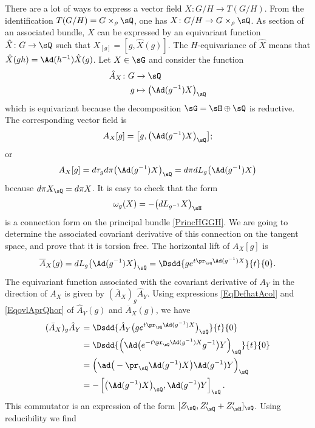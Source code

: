 There are a lot of ways to express a vector field $X\colon G/H\to T(G/H)$. From the identification $T(G/H)=G\times_{\rho}\sQ$, one has $X\colon G/H\to G\times_{\rho}\sQ$. As section of an associated bundle, $X$ can be expressed by an equivariant function $\hat{X}\colon G\to \sQ$ such that $X_{[g]}=[g,\hat{X}(g)]$. The $H$-equivariance of $\hat X$ means that $\hat{X}(gh)=\Ad(h^{-1})\hat{X}(g)$.  Let $X\in\sG$ and consider the function
\begin{equation}        \label{EqDefhatAcol}
	\begin{aligned}
		\hat A_X\colon G & \to \sQ                                \\
		g                & \mapsto \big( \Ad(g^{-1})X \big)_{\sQ}
	\end{aligned}
\end{equation}
which is equivariant because the decomposition $\sG=\sH\oplus\sQ$ is reductive. The corresponding vector field is
\[
	A_X[g]=\big[ g,\big( \Ad(g^{-1})X \big)_{\sQ} \big];
\]
or
\[
	A_X[g]=d\tau_gd\pi\big( \Ad(g^{-1})X \big)_{\sQ}=d\pi dL_g\big( \Ad(g^{-1})X \big)
\]
because $d\pi X_{\sQ}=d\pi X$. It is easy to check that the form
\[
	\omega_g(X)=-\big( dL_{g^{-1}}X \big)_{\sH}
\]
is a connection form on the principal bundle \eqref{PrincHGGH}.  We are going to determine the associated covariant derivative of this connection on the tangent space, and prove that it is torsion free. The horizontal lift of $A_X[g]$ is
\begin{equation}    \label{EqovlAprQhor}
	\overline{ A }_X(g)=dL_g\big( \Ad(g^{-1})X \big)_{\sQ}=\Dsdd{ g e^{t\pr_{\sQ}\Ad(g^{-1})X} }{t}{0}.
\end{equation}
The equivariant function associated with the covariant derivative of $A_Y$ in the direction of $A_X$ is given by $(\overline{ A }_X)_g\hat A_Y$. Using expressions  \eqref{EqDefhatAcol} and  \eqref{EqovlAprQhor} of $\hat A_Y(g)$ and $\overline{ A }_X(g)$, we have
\[
	\begin{split}
		(\bar A_X)_g\hat A_Y  &=\Dsdd{ \hat A_Y\big( g e^{t\pr_{\sQ}\Ad(g^{-1})X} \big)_{\sQ} }{t}{0}\\
		&=\Dsdd{ \left( \Ad\big(  e^{-t\pr_{\sQ}\Ad(g^{-1})X}g^{-1}  \big)Y \right)_{\sQ} }{t}{0}\\
		&=\Big( \ad\big( -\pr_{\sQ}\Ad(g^{-1})X \big)\Ad(g^{-1})Y \Big)_{\sQ}\\
		&=-\left[ \big( \Ad(g^{-1})X \big)_{\sQ},\Ad(g^{-1})Y  \right]_{\sQ}.
	\end{split}
\]
This commutator is an expression of the form $[Z_{\sQ},Z'_{\sQ}+Z'_{\sH}]_{\sQ}$. Using reducibility we find
